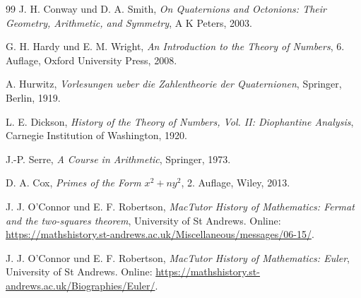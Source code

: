 \documentclass[11pt,a4paper]{article}
\theoremstyle{definition}
\begin{document}
\begin{thebibliography}{99}
J. H. Conway und D. A. Smith,
\emph{On Quaternions and Octonions: Their Geometry, Arithmetic, and Symmetry},
A K Peters, 2003.

G. H. Hardy und E. M. Wright,
\emph{An Introduction to the Theory of Numbers},
6. Auflage, Oxford University Press, 2008.

A. Hurwitz,
\emph{Vorlesungen ueber die Zahlentheorie der Quaternionen},
Springer, Berlin, 1919.

L. E. Dickson,
\emph{History of the Theory of Numbers, Vol. II: Diophantine Analysis},
Carnegie Institution of Washington, 1920.

J.-P. Serre,
\emph{A Course in Arithmetic},
Springer, 1973.

D. A. Cox,
\emph{Primes of the Form $x^2+ny^2$},
2. Auflage, Wiley, 2013.

J. J. O'Connor und E. F. Robertson,
\emph{MacTutor History of Mathematics: Fermat and the two-squares theorem},
University of St Andrews. Online: \url{https://mathshistory.st-andrews.ac.uk/Miscellaneous/messages/06-15/}.

J. J. O'Connor und E. F. Robertson,
\emph{MacTutor History of Mathematics: Euler},
University of St Andrews. Online: \url{https://mathshistory.st-andrews.ac.uk/Biographies/Euler/}.
\end{thebibliography}
\end{document}

